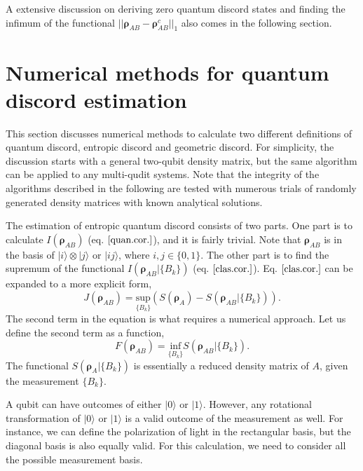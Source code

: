 \documentclass[%
 reprint,
 amsmath,amssymb,
 aps,
]{revtex4-1}
\begin{document}
A extensive discussion on deriving zero quantum discord states and finding the infimum of the functional $||\boldsymbol{\rho}_{AB} - \boldsymbol{\rho}_{AB}^{c}||_{1}$ also comes in the following section.

\section{Numerical methods for quantum discord estimation}
\noindent This section discusses numerical methods to calculate two different definitions of quantum discord, entropic discord and geometric discord. For simplicity, the discussion starts with a general two-qubit density matrix, but the same algorithm can be applied to any multi-qudit systems. Note that the integrity of the algorithms described in the following are tested with numerous trials of randomly generated density matrices with known analytical solutions.

The estimation of entropic quantum discord consists of two parts. One part is to calculate $\textit{I}(\boldsymbol{\rho}_{AB})$ (eq. $\ref{quan.cor.}$), and it is fairly trivial. Note that $\boldsymbol{\rho}_{AB}$ is in the basis of $|i\rangle \otimes |j\rangle$ or $|ij\rangle$, where $i, j \in \{0, 1\}$. The other part is to find the supremum of the functional $\textit{I}(\boldsymbol{\rho}_{AB}|\{B_k\})$ (eq. $\ref{clas.cor.}$). Eq. $\ref{clas.cor.}$ can be expanded to a more explicit form, 
\begin{equation}
\textit{J}(\boldsymbol{\rho}_{AB}) = \underset{\{B_k\}}{\text{sup}} (S(\boldsymbol{\rho}_A) - S(\boldsymbol{\rho}_{AB}|\{B_k\})) \text{.}
\end{equation}
\noindent The second term in the equation is what requires a numerical approach. Let us define the second term as a function, 
\begin{equation}
\textit{F}(\boldsymbol{\rho}_{AB}) = \underset{\{B_k\}}{\text{inf}} S(\boldsymbol{\rho}_{AB}|\{B_k\}) \label{func.} \textit{.}
\end{equation}
\noindent The functional $S(\boldsymbol{\rho}_A|\{B_k\})$ is essentially a reduced density matrix of $A$, given the measurement $\{B_k\}$.

A qubit can have outcomes of either $|0\rangle$ or $|1\rangle$. However, any rotational transformation of $|0\rangle$ or $|1\rangle$ is a valid outcome of the measurement as well. For instance, we can define the polarization of light in the rectangular basis, but the diagonal basis is also equally valid. For this calculation, we need to consider all the possible measurement basis.
\end{document}
